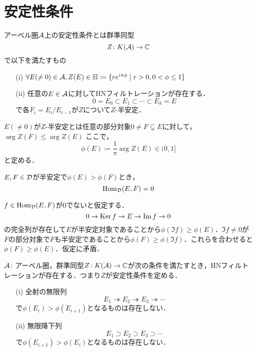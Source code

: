 \section{安定性条件}
	

\begin{defn}\cite{BridgelandStab}
		アーベル圏${\mathcal A}$上の安定性条件とは群準同型
		\[Z\colon K({\mathcal A})\to {\mathbb C}\]
		で以下を満たすもの
\begin{itemize}
	\item[(i)]
		$\forall E(\neq 0)\in{\mathcal A}, Z(E)\in{\mathbb H}\coloneq \{re^{i\pi\phi}\mid r>0, 0<\phi \le 1\}$
	\item[(ii)]
		任意の$E\in{\mathcal A}$に対してHNフィルトレーションが存在する．
		\[0=E_0\subset E_1\subset \cdots \subset E_k = E\]
		で各$F_i = E_i/E_{i-1}$が$Z$について$Z$-半安定．
\end{itemize}
$E(\neq 0)$が$Z$-半安定とは任意の部分対象$0\neq F\subsetneq E$に対して，$\arg Z(F) \le \arg Z(E)$
ここで，
\[\phi(E)\coloneq \frac{1}{\pi}\arg Z(E)\in (0,1] \]
と定める．
\end{defn}	

\begin{lemm}
	$E,F\in{\mathcal D}$が半安定で$\phi(E)>\phi(F)$とき，
	\[\operatorname{\mathrm{Hom}}_{{\mathcal D}}(E,F)=0\]
\end{lemm}
\begin{pf}
	$f\in\operatorname{\mathrm{Hom}}_{{\mathcal D}}(E,F)$が$0$でないと仮定する．
	\[0\rightarrow\operatorname{Ker} f\rightarrow E \rightarrow \Im f \rightarrow 0\]
	の完全列が存在して$E$が半安定対象であることから$\phi(\Im f)\ge\phi(E)$．$\Im f\neq 0$が$F$の部分対象で$F$も半安定であることから$\phi(F)\ge\phi(\Im f)$．これらを合わせると$\phi(F)\ge\phi(E)$．仮定に矛盾．
\end{pf}

\begin{lemm}\cite{BridgelandStab}
		${\mathcal A}\colon$アーベル圏，群準同型$Z\colon K({\mathcal A})\to {\mathbb C}$が次の条件を満たすとき，HNフィルトレーションが存在する．つまり$Z$が安定性条件を定める．
		\begin{itemize}
			\item[(i)]
			全射の無限列
		\[E_1\twoheadrightarrow E_2\twoheadrightarrow E_3\twoheadrightarrow\cdots  \]
		で$\phi (E_i)> \phi (E_{i+1})$となるものは存在しない．
	\item[(ii)]
			無限降下列
		\[E_1\supset E_2\supset E_3\supset \cdots  \]
		で$\phi (E_{i+1}) > \phi(E_i)$となるものは存在しない．
	\end{itemize}
\end{lemm}

